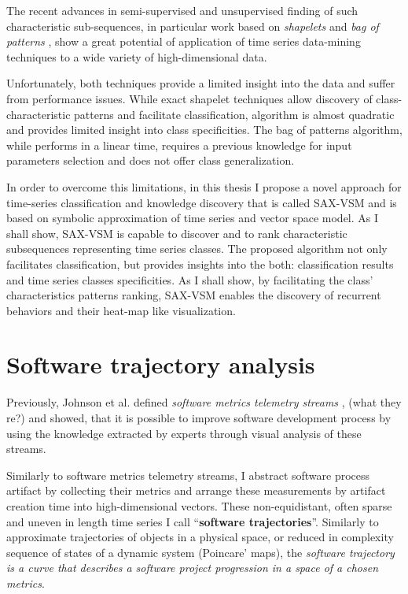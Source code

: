 The recent advances in semi-supervised and unsupervised finding of such characteristic sub-sequences, 
in particular work based on \textit{shapelets} \cite{citeulike:7344347} \cite{citeulike:11957982}
\cite{citeulike:12552293} and \textit{bag of patterns} \cite{citeulike:10525778}, show a great potential 
of application of time series data-mining techniques to a wide variety of high-dimensional data.

Unfortunately, both techniques provide a limited insight into the data and suffer from performance issues. 
While exact shapelet techniques allow discovery of class-characteristic patterns and facilitate classification,
algorithm is almost quadratic and provides limited insight into class specificities. 
The bag of patterns algorithm, while performs in a linear time, requires a previous knowledge for input parameters 
selection and does not offer class generalization.

In order to overcome this limitations, in this thesis I propose a novel approach for time-series classification and 
knowledge discovery that is called SAX-VSM and is based on symbolic approximation of time series and vector space model. 
As I shall show, SAX-VSM is capable to discover and to rank characteristic subsequences representing time series classes. 
The proposed algorithm not only facilitates classification, but provides insights into the both: classification results 
and time series classes specificities. As I shall show, by facilitating the class' characteristics patterns ranking,
SAX-VSM enables the discovery of recurrent behaviors and their heat-map like visualization. 

\section{Software trajectory analysis}\label{section_trajectory_definition}
Previously, Johnson et al. defined \textit{software metrics telemetry streams} \cite{citeulike:12550871}, 
(what they re?) and showed, that it is possible to improve software development process by using the 
knowledge extracted by experts through visual analysis of these streams.
 
Similarly to software metrics telemetry streams, I abstract software process artifact by collecting their 
metrics and arrange these measurements by artifact creation time into high-dimensional vectors. 
These non-equidistant, often sparse and uneven in length time series 
I call ``\textbf{software trajectories}''. Similarly to approximate trajectories of objects in 
a physical space, or reduced in complexity sequence of states of a dynamic system (Poincare' maps), 
the \textit{software trajectory is a curve that describes a software project progression in a space 
of a chosen metrics}.

